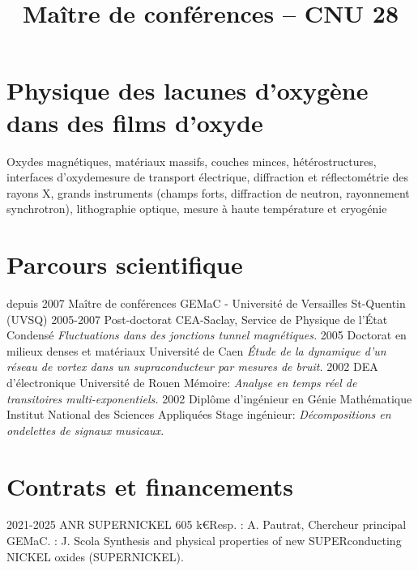 \documentclass[11pt,a4paper,nolmodern]{moderncv}
\title{Maître de conférences -- CNU 28}
\begin{document}
\maketitle

\pagestyle{empty}

\section{Physique des lacunes d'oxygène dans des films d'oxyde}
\cventry
	{}
	{Oxydes magnétiques, matériaux massifs, couches minces, hétérostructures, interfaces d'oxyde}{mesure de transport électrique, diffraction et réflectométrie des rayons X, grands instruments (champs forts, diffraction de neutron, rayonnement synchrotron), lithographie optique, mesure à haute température et cryogénie}{}{}{}
	
\section{Parcours scientifique}
\cventry
	{depuis 2007}
	{Maître de conférences}{}
	{GEMaC - Université de Versailles St-Quentin (UVSQ)}{}
	{}%
\cventry
	{2005-2007}
	{Post-doctorat}{}
	{CEA-Saclay, Service de Physique de l'\'Etat Condensé}{}
	{\emph{Fluctuations dans des jonctions tunnel magnétiques.}}
\cventry
	{2005}
	{Doctorat en milieux denses et matériaux}{}
	{Université de Caen}{}
	{\emph{\'Etude de la dynamique d'un réseau de vortex dans un supraconducteur par mesures de bruit.}}
\cventry
	{2002}
	{DEA d'électronique}{}
	{Université de Rouen}{}
	{Mémoire: \emph{Analyse en temps réel de transitoires multi-exponentiels.}}
\cventry
	{2002}
	{Diplôme d'ingénieur en Génie Mathématique}{}
	{Institut National des Sciences Appliquées}{}
	{Stage ingénieur: \emph{Décompositions en ondelettes de signaux musicaux.}}
	
\section{Contrats et financements}
	\cventry
	{2021-2025}
	{ANR SUPERNICKEL} {605 k€}{Resp. : A. Pautrat, Chercheur principal GEMaC. : J. Scola}{}
	{Synthesis and physical properties of new SUPERconducting NICKEL oxides (SUPERNICKEL).}
	
\end{document}
